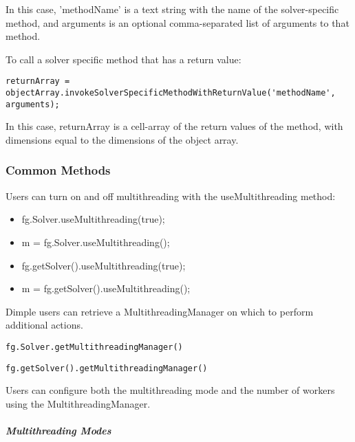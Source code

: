 In this case, 'methodName' is a text string with the name of the solver-specific method, and arguments is an optional comma-separated list of arguments to that method.

To call a solver specific method that has a return value:
\begin{lstlisting}
returnArray = objectArray.invokeSolverSpecificMethodWithReturnValue('methodName', arguments);
\end{lstlisting}

In this case, returnArray is a cell-array of the return values of the method, with dimensions equal to the dimensions of the object array.

\fi

\subsubsection{Common Methods}


Users can turn on and off multithreading with the useMultithreading method:

\ifmatlab
\begin{itemize}
\item fg.Solver.useMultithreading(true);
\item m = fg.Solver.useMultithreading();
\end{itemize}
\fi

\ifjava
\begin{itemize}
\item fg.getSolver().useMultithreading(true);
\item m = fg.getSolver().useMultithreading();
\end{itemize}
\fi


Dimple users can retrieve a MultithreadingManager on which to perform additional actions.

\ifmatlab
\begin{lstlisting}
fg.Solver.getMultithreadingManager()
\end{lstlisting}
\fi

\ifjava
\begin{lstlisting}
fg.getSolver().getMultithreadingManager()
\end{lstlisting}
\fi

Users can configure both the multithreading mode and the number of workers using the MultithreadingManager.

\subparagraph{Multithreading Modes}

